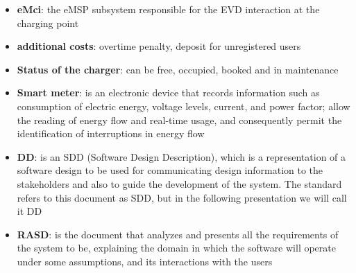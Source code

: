 \begin{itemize}
    \item \textbf{eMci}: the eMSP subsystem responsible for the EVD interaction at the charging point
    \item \textbf{additional costs}: overtime penalty, deposit for unregistered users
    \item \textbf{Status of the charger}: can be free, occupied, booked and in maintenance
    \item \textbf{Smart meter}: is an electronic device that records information such as consumption of electric energy, voltage levels, current, and power factor; allow the reading of energy flow and real-time usage, and consequently permit the identification of interruptions in energy flow
    \item \textbf{DD}: is an SDD (Software Design Description), which is a representation of a software design to be used for communicating design information to the stakeholders and also to guide the development of the system. The standard refers to this document as SDD, but in the following presentation we will call it DD 
    \item \textbf{RASD}: is the document that analyzes and presents all the requirements of the system to be, explaining the domain in which the software will operate under some assumptions, and its interactions with the users 
\end{itemize}

